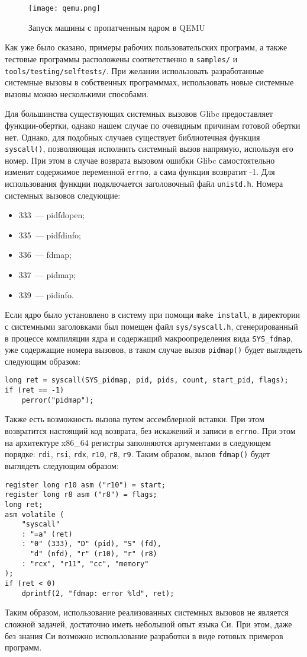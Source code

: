 \begin{figure}
  \centering
  \texttt{[image: qemu.png]}
  \caption{Запуск машины с пропатченным ядром в QEMU}
  \label{fig:qemu}
\end{figure}

Как уже было сказано, примеры рабочих пользовательских программ, а также
тестовые программы расположены соответственно в \texttt{samples/} и
\texttt{tools/testing/selftests/}. При желании использовать разработанные
системные вызовы в собственных программмах, использовать новые системные вызовы
можно несколькими способами.

Для большинства существующих системных вызовов Glibc предоставляет
функции-обертки, однако нашем случае по очевидным причинам готовой обертки нет.
Однако, для подобных случаев существует библиотечная функция \texttt{syscall()},
позволяющая исполнить системный вызов напрямую, используя его номер. При этом в
случае возврата вызовом ошибки Glibc самостоятельно изменит содержимое
переменной \texttt{errno}, а сама функция возвратит -1. Для использования
функции подключается заголовочный файл \texttt{unistd.h}. Номера системных
вызовов следующие:
\begin{itemize}
\item 333~--- pidfdopen;
\item 335~--- pidfdinfo;
\item 336~--- fdmap;
\item 337~--- pidmap;
\item 339~--- pidinfo.
\end{itemize}

Если ядро было установлено в систему при помощи \texttt{make install}, в
директории с системными заголовками был помещен файл \texttt{sys/syscall.h},
сгенерированный в процессе компиляции ядра и содержащий макроопределения вида
\texttt{SYS\_fdmap}, уже содержащие номера вызовов, в таком случае вызов
\texttt{pidmap()} будет выглядеть следующим образом:
\medskip
\begin{lstlisting}[style=cstyle]
long ret = syscall(SYS_pidmap, pid, pids, count, start_pid, flags);
if (ret == -1)
	perror("pidmap");
\end{lstlisting}
\medskip

Также есть возможность вызова путем ассемблерной вставки. При этом возвратится
настоящий код возврата, без искажений и записи в \texttt{errno}. При этом на
архитектуре x86\_64 регистры заполняются аргументами в следующем порядке:
\texttt{rdi}, \texttt{rsi}, \texttt{rdx}, \texttt{r10}, \texttt{r8},
\texttt{r9}. Таким образом, вызов \texttt{fdmap()} будет выглядеть следующим
образом:
\medskip
\begin{lstlisting}[style=cstyle]
register long r10 asm ("r10") = start;
register long r8 asm ("r8") = flags;
long ret;
asm volatile (
	"syscall"
	: "=a" (ret)
	: "0" (333), "D" (pid), "S" (fd),
	  "d" (nfd), "r" (r10), "r" (r8)
	: "rcx", "r11", "cc", "memory"
);
if (ret < 0)
	dprintf(2, "fdmap: error %ld", ret);
\end{lstlisting}
\medskip

Таким образом, использование реализованных системных вызовов не является сложной
задачей, достаточно иметь небольшой опыт языка Си. При этом, даже без знания Си
возможно использование разработки в виде готовых примеров программ.
